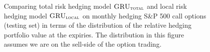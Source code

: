 \documentclass[letterpaper,12pt,titlepage,oneside,final]{book}
\numberwithin{equation}{section}
\theoremstyle{definition}
\newcommand{\modelT}{\textsc{GRU}_{\textsc{total}}}
\newcommand{\modelL}{\textsc{GRU}_{\textsc{local}}}
\begin{document}
\begin{figure}[htp!]
	\centering
	\caption{Comparing total risk hedging model $\modelT$ and local risk hedging model $\modelL$ on monthly hedging S\&P 500 call options (testing set) in terms of the distribution of the  relative hedging portfolio value at the expiries. The distribution in this figure assumes we are on the sell-side of the option trading.} \label{fig:CallTotalM1}
		\centering

\end{figure}
\end{document}
